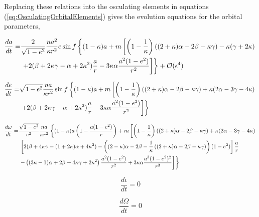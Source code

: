 Replacing these relations into the osculating elements in equations (\ref{eq:OsculatingOrbitalElements}) gives the evolution equations for the orbital parameters,
\begin{footnotesize}
\begin{align}
\frac{da}{dt} = & \frac{2}{\sqrt{1-e^2}} \frac{na^2}{\kappa r^2} e \sin f \left\lbrace (1-\kappa) a + m \left[ \left( 1 - \frac{1}{\kappa} \right) \left((2+\kappa)\alpha - 2\beta -\kappa \gamma \right) -\kappa (\gamma + 2\kappa) \right. \right. \notag \\ 
& \left. \left. +2(\beta + 2 \kappa \gamma - \alpha + 2 \kappa^2)  \frac{a}{r} - 3 \kappa \alpha \frac{a^2 (1-e^2)}{r^2}  \right] \right\rbrace + \mathcal{O} ( \epsilon ^4 )
\end{align}
\end{footnotesize}

\begin{footnotesize}
\begin{align}
\frac{de}{dt} = & \sqrt{1-e^2} \frac{na}{\kappa r^2}  \sin f \left\lbrace (1-\kappa) a + m \left[ \left( 1 - \frac{1}{\kappa} \right) \left((2+\kappa)\alpha - 2\beta -\kappa \gamma \right) + \kappa (2\alpha-3\gamma - 4\kappa)  \right. \right. \notag \\ 
& \left. \left. +  2(\beta + 2 \kappa \gamma - \alpha + 2 \kappa^2)\frac{a}{r} -3 \kappa \alpha \frac{a^2 (1-e^2)}{r^2}  \right] \right\rbrace
\end{align}
\end{footnotesize}

\begin{footnotesize}
\begin{align}
\frac{d\omega}{dt} = & \frac{\sqrt{1-e^2}}{e^2} \frac{na}{\kappa r^2}  \left\lbrace (1-\kappa) a \left( 1 - \frac{a(1-e^2)}{r} \right)+ m \left[ \left( 1 - \frac{1}{\kappa} \right) \left((2+\kappa)\alpha - 2\beta -\kappa \gamma \right) + \kappa (2\alpha-3\gamma - 4\kappa) \right. \right. \notag \\ 
& \left. \left. \left[ 2 (\beta + 4\kappa \gamma - (1+2\kappa)\alpha + 4\kappa^2) - \left( (2-\kappa)\alpha - 2\beta - \frac{1}{\kappa} \left( (2+\kappa)\alpha - 2\beta - \kappa \gamma \right) \right)(1-e^2) \right] \frac{a}{r}  \right. \right. \notag \\
&\left. \left. -\left( (3\kappa -1)\alpha + 2\beta + 4\kappa \gamma + 2 \kappa^2 \right) \frac{a^2 (1-e^2)}{r^2}  +3\kappa \alpha \frac{a^3 (1-e^2)^2}{r^3}  \right] \right\rbrace
\end{align}
\end{footnotesize}

\begin{footnotesize}
\begin{equation}
\frac{d \iota}{dt} =0
\end{equation}
\end{footnotesize}

\begin{footnotesize}
\begin{equation}
\frac{d \Omega}{dt} =0
\end{equation}
\end{footnotesize}